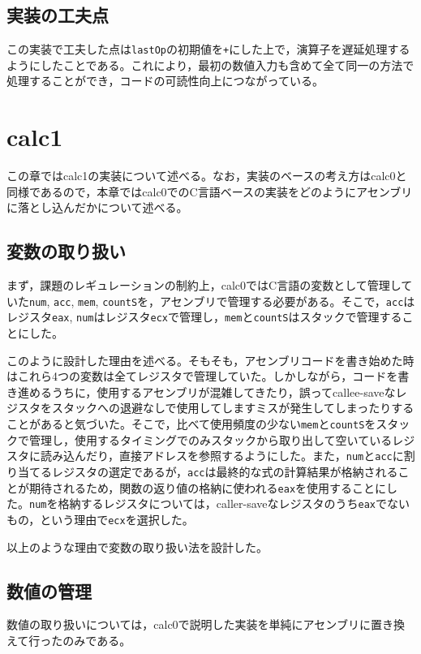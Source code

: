 \documentclass[a4paper]{jsarticle}
\newcommand{\var}[1]{\texttt{#1}}
\begin{document}
\subsection{実装の工夫点}
この実装で工夫した点は\var{lastOp}の初期値を\var{+}にした上で，演算子を遅延処理するようにしたことである。これにより，最初の数値入力も含めて全て同一の方法で処理することができ，コードの可読性向上につながっている。

\section{calc1}
この章ではcalc1の実装について述べる。なお，実装のベースの考え方はcalc0と同様であるので，本章ではcalc0でのC言語ベースの実装をどのようにアセンブリに落とし込んだかについて述べる。

\subsection{変数の取り扱い}
まず，課題のレギュレーションの制約上，calc0ではC言語の変数として管理していた\var{num}, \var{acc}, \var{mem}, \var{countS}を，アセンブリで管理する必要がある。そこで，\var{acc}はレジスタ\var{eax}, \var{num}はレジスタ\var{ecx}で管理し，\var{mem}と\var{countS}はスタックで管理することにした。

このように設計した理由を述べる。そもそも，アセンブリコードを書き始めた時はこれら4つの変数は全てレジスタで管理していた。しかしながら，コードを書き進めるうちに，使用するアセンブリが混雑してきたり，誤ってcallee-saveなレジスタをスタックへの退避なしで使用してしますミスが発生してしまったりすることがあると気づいた。そこで，比べて使用頻度の少ない\var{mem}と\var{countS}をスタックで管理し，使用するタイミングでのみスタックから取り出して空いているレジスタに読み込んだり，直接アドレスを参照するようにした。また，\var{num}と\var{acc}に割り当てるレジスタの選定であるが，\var{acc}は最終的な式の計算結果が格納されることが期待されるため，関数の返り値の格納に使われる\var{eax}を使用することにした。\var{num}を格納するレジスタについては，caller-saveなレジスタのうち\var{eax}でないもの，という理由で\var{ecx}を選択した。

以上のような理由で変数の取り扱い法を設計した。

\subsection{数値の管理}
数値の取り扱いについては，calc0で説明した実装を単純にアセンブリに置き換えて行ったのみである。
\end{document}
